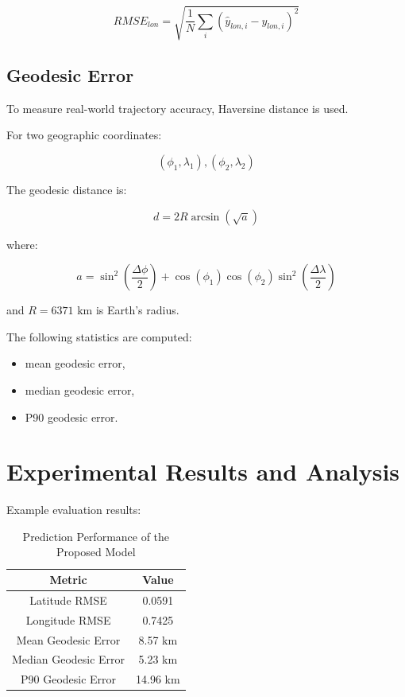 \documentclass[11pt]{article}
\begin{document}
\begin{equation}
RMSE_{lon}
=
\sqrt{
\frac{1}{N}
\sum_i
(\hat{y}_{lon,i}-y_{lon,i})^2
}
\end{equation}

\subsection{Geodesic Error}

To measure real-world trajectory accuracy, Haversine distance is used.

For two geographic coordinates:

\begin{equation}
(\phi_1,\lambda_1)
,
(\phi_2,\lambda_2)
\end{equation}

The geodesic distance is:

\begin{equation}
d
=
2R
\arcsin
\left(
\sqrt{a}
\right)
\end{equation}

where:

\begin{equation}
a
=
\sin^2\left(\frac{\Delta \phi}{2}\right)
+
\cos(\phi_1)
\cos(\phi_2)
\sin^2\left(\frac{\Delta \lambda}{2}\right)
\end{equation}

and $R=6371$ km is Earth's radius.

The following statistics are computed:

\begin{itemize}
    \item mean geodesic error,
    \item median geodesic error,
    \item P90 geodesic error.
\end{itemize}

\section{Experimental Results and Analysis}

Example evaluation results:

\begin{table}[H]
\centering
\begin{tabular}{cc}
\toprule
Metric & Value \\
\midrule
Latitude RMSE & 0.0591 \\
Longitude RMSE & 0.7425 \\
Mean Geodesic Error & 8.57 km \\
Median Geodesic Error & 5.23 km \\
P90 Geodesic Error & 14.96 km \\
\bottomrule
\end{tabular}
\caption{Prediction Performance of the Proposed Model}
\end{table}
\end{document}
